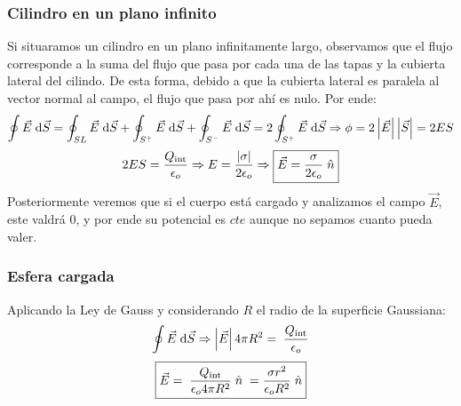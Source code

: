 \subsubsection{Cilindro en un plano infinito}
Si situaramos un cilindro en un plano infinitamente largo, observamos que el flujo corresponde a la suma del flujo que pasa por cada una de las tapas y la cubierta lateral del cilindo. De esta forma, debido a que la cubierta lateral es paralela al vector normal al campo, el flujo que pasa por ahí es nulo. Por ende:
\[
        \oint \vec{E}\hspace{1mm}\mathrm{d} \vec{S} = \oint_{SL}\vec{E}\hspace{1mm}\mathrm{d} \vec{S} +\oint_{S^+}\vec{E}\hspace{1mm}\mathrm{d} \vec{S}+\oint_{S^-}\vec{E}\hspace{1mm}\mathrm{d} \vec{S} =
        2 \oint_{S^+} \vec{E}\hspace{1mm}\mathrm{d} \vec{S} \Rightarrow \phi =2\left | \vec{E} \right |\left | \vec{S} \right | = 2ES
\]
\[
        2ES = \frac{Q_{\textnormal{int}}}{\epsilon_o} \Rightarrow E = \frac{\left | \sigma \right |}{2\epsilon_o} \Rightarrow \boxed{\vec{E} = \frac{\sigma}{2\epsilon_o}\hspace{1mm}\hat{n}}
\]
Posteriormente veremos que si el cuerpo está cargado y analizamos el campo \(\vec{E}\), este valdrá 0, y por ende su potencial es \(cte\) aunque no sepamos cuanto pueda valer.
\subsubsection{Esfera cargada}
Aplicando la Ley de Gauss y considerando \(R\) el radio de la superficie Gaussiana:
\[
        \oint \vec{E} \hspace{1mm} \mathrm{d}\vec{S} \Rightarrow \left | \vec{E} \right | 4\pi R^2 = \hspace{1mm} \frac{Q_{\textnormal{int}}}{\epsilon_o}
\]
\[
        \boxed{\vec{E}  = \hspace{1mm} \frac{Q_{\textnormal{int}}}{\epsilon_o4\pi R^2} \hspace{1mm}\hat{n} \hspace{1mm} = \frac{\sigma r^2}{\epsilon_o R^2} \hspace{1mm}\hat{n}}
\]
\vspace{3cm}
